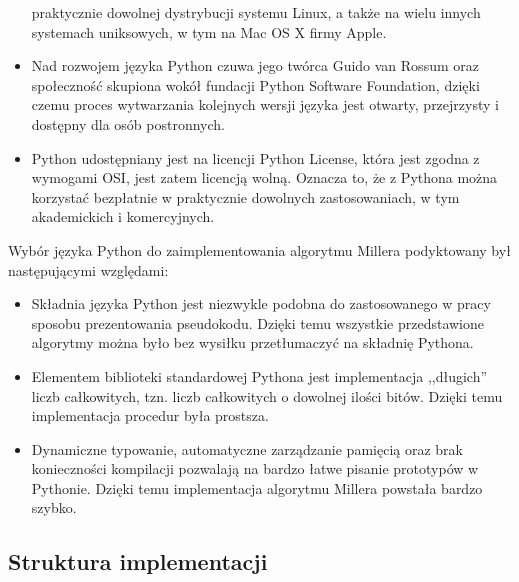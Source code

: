 \begin{itemize}
praktycznie dowolnej dystrybucji systemu Linux,
a także na wielu innych systemach uniksowych,
w tym na Mac OS X firmy Apple.
\item
Nad rozwojem języka Python czuwa jego twórca Guido van Rossum
oraz społeczność skupiona wokół fundacji Python Software Foundation,
dzięki czemu proces wytwarzania kolejnych wersji języka
jest otwarty, przejrzysty i dostępny dla osób postronnych.
\item
Python udostępniany jest na licencji Python License,
która jest zgodna z wymogami OSI, jest zatem licencją wolną.
Oznacza to, że z Pythona można korzystać bezpłatnie
w praktycznie dowolnych zastosowaniach, w tym akademickich i komercyjnych.
\end{itemize}

\noindent
Wybór języka Python do zaimplementowania algorytmu Millera
podyktowany był następującymi względami:
\begin{itemize}
\item
Składnia języka Python jest niezwykle podobna
do zastosowanego w pracy sposobu prezentowania pseudokodu.
Dzięki temu wszystkie przedstawione algorytmy
można było bez wysiłku przetłumaczyć
na składnię Pythona.
\item
Elementem biblioteki standardowej Pythona
jest implementacja ,,długich'' liczb całkowitych,
tzn. liczb całkowitych o dowolnej ilości bitów.
Dzięki temu implementacja procedur była prostsza.
\item
Dynamiczne typowanie, automatyczne zarządzanie pamięcią
oraz brak konieczności kompilacji
pozwalają na bardzo łatwe pisanie prototypów w Pythonie.
Dzięki temu implementacja algorytmu Millera powstała bardzo szybko.
\end{itemize}

\subsection*{Struktura implementacji}

